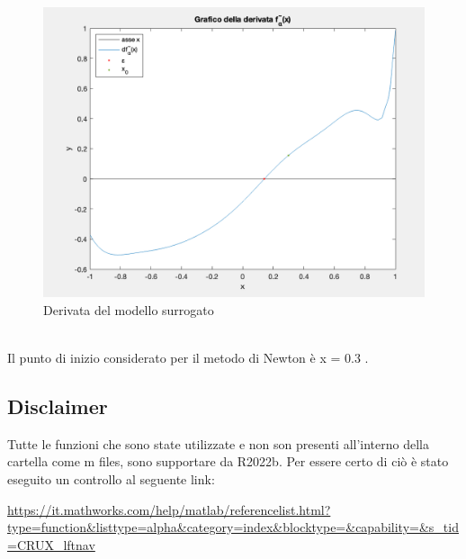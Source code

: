 \documentclass{article}
\begin{document}
\begin{figure}[!h]
    \centering
    \label{fig:derivata}
    \includegraphics[width=1\textwidth]{images/derivata.png}
    \caption{Derivata del modello surrogato}
\end{figure}
\\Il punto di inizio considerato per il metodo di Newton è x = 0.3 .\\
\subsection*{Disclaimer}
Tutte le funzioni che sono state utilizzate e non son presenti all'interno della cartella come m files, sono supportare da R2022b. Per essere certo di ciò è stato eseguito un controllo al seguente link:
\begin{center}
    \url{https://it.mathworks.com/help/matlab/referencelist.html?type=function&listtype=alpha&category=index&blocktype=&capability=&s_tid=CRUX_lftnav}
\end{center}

\clearpage
\end{document}
